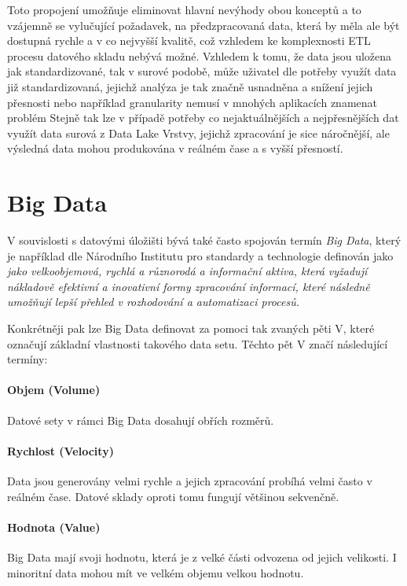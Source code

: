 \documentclass[
  digital,     %
  twoside,     %
  lof,         %
  lot,         %
]{fithesis4}
\begin{document}
Toto propojení umožňuje eliminovat hlavní nevýhody obou konceptů a to vzájemně se vylučující požadavek, na předzpracovaná data, která by měla ale být dostupná rychle a v co nejvyšší kvalitě, což vzhledem ke komplexnosti ETL procesu datového skladu nebývá možné. Vzhledem k tomu, že data jsou uložena jak standardizované, tak v surové podobě, může uživatel dle potřeby využít data již standardizovaná, jejichž analýza je tak značně usnadněna a snížení jejich přesnosti nebo například granularity nemusí v mnohých aplikacích znamenat problém Stejně tak lze v případě potřeby co nejaktuálnějších  a nejpřesnějších dat využít data surová z Data Lake Vrstvy, jejichž zpracování je sice náročnější, ale výsledná data mohou produkována v reálném čase a s vyšší přesností.\parencite[s.~3]{Harby20221217} 


\section{Big Data}
V souvislosti s datovými úložišti bývá také často spojován termín \emph{Big Data}, který je například dle Národního Institutu pro standardy a technologie definován jako \emph{jako velkoobjemová, rychlá a různorodá a informační aktiva, která vyžadují nákladově efektivní a inovativní formy zpracování informací, které následně umožňují lepší přehled v rozhodování a automatizaci procesů.  } \parencite{Gartner} 

Konkrétněji pak lze Big Data definovat za pomoci tak zvaných pěti V, které označují základní vlastnosti takového data setu.  Těchto pět V značí následující termíny: \parencite{big_data}
\paragraph{Objem (Volume) }
Datové sety v rámci Big Data dosahují obřích rozměrů.

\paragraph{Rychlost (Velocity)}
Data jsou generovány velmi rychle a jejich zpracování probíhá velmi často v reálném čase. Datové sklady oproti tomu fungují většinou sekvenčně.

\paragraph{Hodnota (Value)}
Big Data mají svoji hodnotu, která je z velké části odvozena od jejich velikosti. I minoritní data mohou mít ve velkém objemu velkou hodnotu. 
\end{document}
